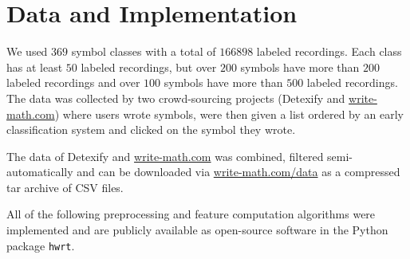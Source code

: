 
\section{Data and Implementation}
We used $\num{369}$ symbol classes with a total of $\num{166898}$ labeled
recordings. Each class has at least $\num{50}$ labeled recordings, but over
$200$ symbols have more than $\num{200}$ labeled recordings and over $100$
symbols have more than $500$ labeled recordings.
The data was collected by two crowd-sourcing projects (Detexify and
\href{http://write-math.com}{write-math.com}) where users wrote
symbols, were then given a list ordered by an early classification system and
clicked on the symbol they wrote.

The data of Detexify and \href{http://write-math.com}{write-math.com} was
combined, filtered semi-automatically and can be downloaded via
\href{http://write-math.com/data}{write-math.com/data} as a compressed tar
archive of CSV files.

All of the following preprocessing and feature computation algorithms were
implemented and are publicly available as open-source software in the Python
package \texttt{hwrt}.